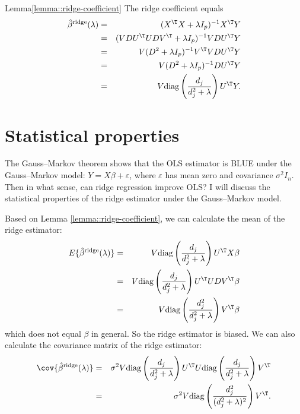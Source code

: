 \begin{myproof}{Lemma}{\ref{lemma::ridge-coefficient}}
The ridge coefficient equals
\begin{eqnarray*}
 \hat{\beta}^{\text{ridge}}(\lambda) &=& (X^{\T}X+\lambda I_{p})^{-1}X^{\T}Y \\
 &=& ( VDU^{\T} UD V^{\T}  + \lambda I_p)^{-1} VDU^{\T} Y \\
 &=& V( D^2 + \lambda I_p )^{-1} V^{\T} V D U^{\T} Y\\
 &=& V( D^2 + \lambda I_p )^{-1}   D U^{\T} Y\\
 &=& V\text{diag}\left(  \frac{d_j}{d_j^2 + \lambda }  \right) U^{\T} Y.
\end{eqnarray*}
\end{myproof}





\section{Statistical properties}

The Gauss--Markov theorem shows that the OLS estimator is BLUE under the Gauss--Markov
model: $Y=X\beta+\varepsilon$, where $\varepsilon$ has mean zero
and covariance $\sigma^{2}I_{n}$. Then in what sense, can ridge regression improve OLS? I will discuss the statistical properties of the
ridge estimator under the Gauss--Markov model. 

 


Based on Lemma \ref{lemma::ridge-coefficient}, we can calculate the mean of the ridge estimator:
\begin{eqnarray*}
E\{  \hat{\beta}^{\text{ridge}}(\lambda)\} &=& V\text{diag}\left(  \frac{d_j}{d_j^2 + \lambda }  \right)  U^{\T} X\beta \\
&=&  V\text{diag}\left(  \frac{d_j}{d_j^2 + \lambda }  \right)  U^{\T} UDV^{\T}\beta \\
&=& V\text{diag}\left(  \frac{d_j^2}{d_j^2 + \lambda }  \right) V^{\T}\beta
\end{eqnarray*}
which does not equal $\beta$ in general. So the ridge estimator is biased. We can also calculate the covariance  matrix of the ridge estimator:
\begin{eqnarray*}
\cov\{  \hat{\beta}^{\text{ridge}}(\lambda)\} &=& \sigma^2 V\text{diag}\left(  \frac{d_j}{d_j^2 + \lambda }  \right)  U^{\T}  
U\text{diag}\left(  \frac{d_j}{d_j^2 + \lambda }  \right) V^{\T}  \\
&=&  \sigma^2 V\text{diag}\left(  \frac{d_j^2}{(d_j^2 + \lambda)^2 }  \right)   V^{\T}  . 
\end{eqnarray*}


